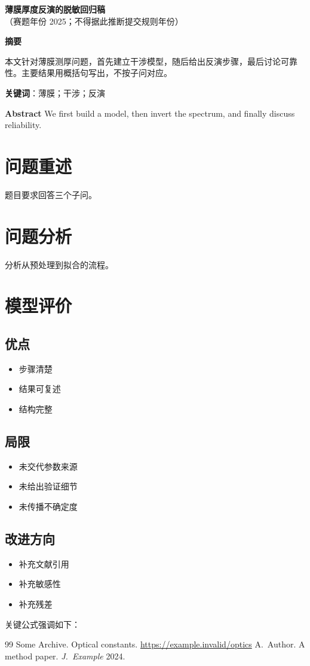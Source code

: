 \documentclass[12pt,a4paper]{ctexart}
\begin{document}
\begin{center}
{\Large\bfseries 薄膜厚度反演的脱敏回归稿}\\
{\small （赛题年份 2025；不得据此推断提交规则年份）}
\end{center}

\textbf{摘\quad 要}

本文针对薄膜测厚问题，首先建立干涉模型，随后给出反演步骤，最后讨论可靠性。主要结果用概括句写出，不按子问对应。

\vspace{0.4em}
\textbf{关键词}：薄膜；干涉；反演

\vspace{0.5em}
\textbf{Abstract}\quad
We first build a model, then invert the spectrum, and finally discuss reliability.

\newpage
\section{问题重述}
题目要求回答三个子问。

\section{问题分析}
分析从预处理到拟合的流程。

\section{模型评价}
\subsection{优点}
\begin{itemize}
\item 步骤清楚
\item 结果可复述
\item 结构完整
\end{itemize}
\subsection{局限}
\begin{itemize}
\item 未交代参数来源
\item 未给出验证细节
\item 未传播不确定度
\end{itemize}
\subsection{改进方向}
\begin{itemize}
\item 补充文献引用
\item 补充敏感性
\item 补充残差
\end{itemize}

关键公式强调如下：

\begin{thebibliography}{99}
 Some Archive. Optical constants. \url{https://example.invalid/optics}
 A.~Author. A method paper. \textit{J.~Example} 2024.
\end{thebibliography}
\end{document}
